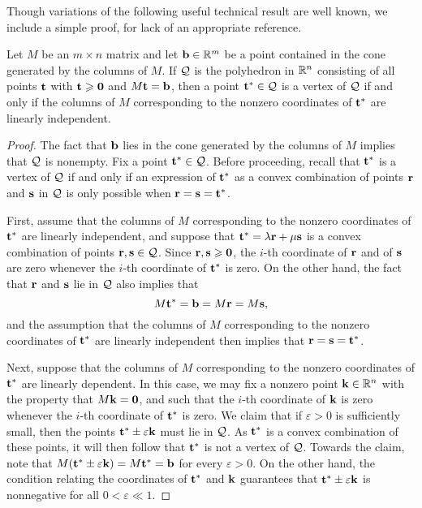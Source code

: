 \documentclass[11pt]{amsart}
\begin{document}
Though variations of the following useful technical result are well known, we include a simple proof, for lack of an appropriate reference.

\begin{proposition}
\label{vertex: P}
Let $M$ be an $m \times n$ matrix and let $\mathbf{b} \in \mathbb{R}^m$ be a point contained in the cone generated by the columns of $M$.  If $\mathcal{Q}$ is the polyhedron in $\mathbb{R}^n$  consisting of all points $\mathbf{t}$ with $\mathbf{t} \geqslant \mathbf{0}$ and $M \mathbf{t} = \mathbf{b}$, then a point $\mathbf{t}^{\ast} \in \mathcal{Q}$ is a vertex of $\mathcal{Q}$ if and only if the columns of $M$ corresponding to the nonzero coordinates of $\mathbf{t}^{\ast}$ are linearly independent.  %
\end{proposition}

\begin{proof}
   The fact that $\mathbf{b}$ lies in the cone generated by the columns of $M$ implies that $\mathcal{Q}$ is nonempty.
   Fix a point $\mathbf{t}^{\ast} \in \mathcal{Q}$.
   Before proceeding, recall that $\mathbf{t}^{\ast}$ is a vertex of $\mathcal{Q}$ if and only if an expression of $\mathbf{t}^{\ast}$ as a convex combination of points $\mathbf{r}$ and $\mathbf{s}$ in $\mathcal{Q}$ is only possible when $\mathbf{r}=\mathbf{s}=\mathbf{t}^{\ast}$.

   First, assume that the columns of $M$ corresponding to the nonzero coordinates of $\mathbf{t}^{\ast}$ are linearly independent, and suppose that $\mathbf{t}^{\ast} = \lambda \mathbf{r} + \mu \mathbf{s}$ is a convex combination of points $\mathbf{r}, \mathbf{s} \in \mathcal{Q}$.
   Since $\mathbf{r},\mathbf{s}\geqslant \mathbf{0}$, the $i$-th coordinate of $\mathbf{r}$ and of $\mathbf{s}$ are zero whenever the $i$-th coordinate of $\mathbf{t}^{\ast}$ is zero.
   On the other hand, the fact that $\mathbf{r}$ and $\mathbf{s}$ lie in $\mathcal{Q}$ also implies that
   \[ M \mathbf{t}^{\ast} = \mathbf{b} = M \mathbf{r} = M \mathbf{s}, \]
   and the assumption that the columns of $M$ corresponding to the nonzero coordinates of $\mathbf{t}^{\ast}$ are linearly independent then implies that $\mathbf{r}=\mathbf{s}=\mathbf{t}^{\ast}$.

Next, suppose that the columns of $M$ corresponding to the nonzero coordinates of $\mathbf{t}^{\ast}$ are linearly dependent.   In this case, we may fix a nonzero point $\mathbf{k} \in \mathbb{R}^n$ with the property that $M \mathbf{k} = \mathbf{0}$, and such that the $i$-th coordinate of $\mathbf{k}$ is zero whenever the $i$-th coordinate of $\mathbf{t}^{\ast}$ is zero.  We claim that if $\varepsilon > 0$ is sufficiently small, then the points $\mathbf{t}^{\ast} \pm \varepsilon \mathbf{k}$ must lie in $\mathcal{Q}$.   As $\mathbf{t}^{\ast}$ is a convex combination of these points, it will then follow that $\mathbf{t}^{\ast}$ is not a vertex of $\mathcal{Q}$.  Towards the claim, note that $M(\mathbf{t}^{\ast} \pm \varepsilon \mathbf{k}) = M \mathbf{t}^{\ast} = \mathbf{b}$ for every $\varepsilon > 0$.  On the other hand, the condition relating the coordinates of $\mathbf{t}^{\ast}$ and $\mathbf{k}$ guarantees that $\mathbf{t}^{\ast} \pm \varepsilon \mathbf{k}$ is nonnegative for all $0 < \varepsilon \ll 1$.
\end{proof}
\end{document}
